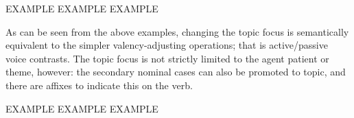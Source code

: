 \documentclass[grammar]{subfiles}
\begin{document}
  \begin{exe}
    \ex
    \begin{xlist}
      \ex EXAMPLE
      \ex EXAMPLE
      \ex EXAMPLE
    \end{xlist}
  \end{exe}

  As can be seen from the above examples, changing the topic focus is semantically equivalent to the simpler valency-adjusting operations; that is active/passive voice contrasts. The topic focus is not strictly limited to the agent patient or theme, however: the secondary nominal cases can also be promoted to topic, and there are affixes to indicate this on the verb\footnotemark{}.


  \begin{exe}
    \ex
    \begin{xlist}
      \ex EXAMPLE
      \ex EXAMPLE
      \ex EXAMPLE
    \end{xlist}
  \end{exe}






\end{document}
